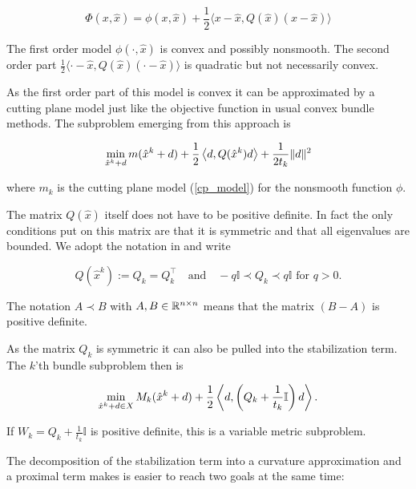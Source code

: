 \begin{equation}
	\Phi(x,\hat{x}) = \phi(x,\hat{x})+\frac{1}{2}\langle x-\hat{x},Q(\hat{x})(x-\hat{x})\rangle
\end{equation}

The first order model \(\phi(\cdot,\hat{x})\) is convex and possibly nonsmooth. The second order part \(\frac{1}{2}\langle \cdot-\hat{x},Q(\hat{x})(\cdot-\hat{x})\rangle\) is quadratic but not necessarily convex.

As the first order part of this model is convex it can be approximated by a cutting plane model just like the objective function in usual convex bundle methods. The subproblem emerging from this approach is

\begin{equation*}
	\min_{\hat{x}^k+d} m(\hat{x}^k+d)+\frac{1}{2}\left\langle d,Q(\hat{x}^k)d \right\rangle + \frac{1}{2t_k}\|d\|^2
\label{sub_prob_Noll}
\end{equation*} 

where \(m_k\) is the cutting plane model (\ref{cp_model}) for the nonsmooth function \(\phi\).

The matrix \(Q(\hat{x})\) itself does not have to be positive definite. In fact the only conditions put on this matrix are that it is symmetric and that all eigenvalues are bounded.
We adopt the notation in \cite{Noll2013} and write

\begin{equation*}
		Q(\hat{x}^k):=Q_k = Q_k^{\top} \quad \text{and} \quad -q\mathbb{I} \prec Q_k \prec q\mathbb{I} \text{ for } q > 0.
\end{equation*}

The notation \( A \prec B\) with \(A, B \in \mathbb{R}^{n\times n}\) means that the matrix \((B-A)\) is positive definite.

As the matrix \(Q_k\) is symmetric it can also be pulled into the stabilization term. The \(k\)'th bundle subproblem then is

\begin{equation}
	\min_{\hat{x}^k+d \in X} M_k(\hat{x}^k+d) + \frac{1}{2}\left\langle d,\left(Q_k+\frac{1}{t_k}\mathbb{I} \right) d \right\rangle.
	\label{Q_subprob}
\end{equation}

If \(W_k = Q_k+\frac{1}{t_k}\mathbb{I}\) is positive definite, this is a variable metric subproblem.

The decomposition of the stabilization term into a curvature approximation and a proximal term makes is easier to reach two goals at the same time:

